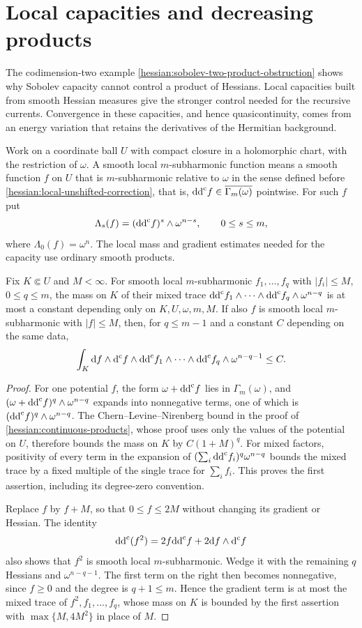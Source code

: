 \section{Local capacities and decreasing products}
\label{sec:hessian-smooth-capacity}

The codimension-two example
\cref{hessian:sobolev-two-product-obstruction} shows why Sobolev
capacity cannot control a product of Hessians. Local capacities built
from smooth Hessian measures give the stronger control needed for the
recursive currents. Convergence in these capacities, and hence
quasicontinuity, comes from an energy variation that retains the
derivatives of the Hermitian background.

Work on a coordinate ball $U$ with compact closure in a holomorphic
chart, with the restriction of $\omega$. A smooth local
$m$-subharmonic function means a smooth function $f$ on $U$ that is
$m$-subharmonic relative to $\omega$ in the sense defined before
\cref{hessian:local-unshifted-correction}, that is,
$\mathrm{dd}^{\mathrm{c}} f\in\overline{\Gamma_m(\omega)}$ pointwise. For such $f$ put
\[
 \Lambda_s(f)=(\mathrm{dd}^{\mathrm{c}} f)^s\wedge\omega^{n-s},\qquad0\leq s\leq m,
\]
where $\Lambda_0(f)=\omega^n$. The local mass and gradient estimates
needed for the capacity use ordinary smooth products.

\begin{lemma}\label{hessian:local-smooth-bounds}
Fix $K\Subset U$ and $M<\infty$. For smooth local $m$-subharmonic
$f_1,\ldots,f_q$ with $|f_i|\leq M$, $0\leq q\leq m$, the mass on $K$
of their mixed trace
$\mathrm{dd}^{\mathrm{c}} f_1\wedge\cdots\wedge\mathrm{dd}^{\mathrm{c}} f_q\wedge\omega^{n-q}$ is at most a
constant depending only on $K,U,\omega,m,M$. If also $f$ is smooth
local $m$-subharmonic with $|f|\leq M$, then, for $q\leq m-1$ and a
constant $C$ depending on the same data,
\[
 \int_K\mathrm df\wedge\mathrm d^{\mathrm c} f\wedge
       \mathrm{dd}^{\mathrm{c}} f_1\wedge\cdots\wedge\mathrm{dd}^{\mathrm{c}} f_q
                         \wedge\omega^{n-q-1}\leq C.
\]
\end{lemma}
\begin{proof}
For one potential $f$, the form $\omega+\mathrm{dd}^{\mathrm{c}} f$ lies in
$\Gamma_m(\omega)$, and $(\omega+\mathrm{dd}^{\mathrm{c}} f)^q\wedge\omega^{n-q}$ expands
into nonnegative terms, one of which is $(\mathrm{dd}^{\mathrm{c}} f)^q\wedge\omega^{n-q}$.
The Chern--Levine--Nirenberg bound in the proof of
\cref{hessian:continuous-products}, whose proof uses only the values of
the potential on $U$, therefore bounds the mass on $K$ by $C(1+M)^q$.
For mixed factors, positivity of every term in the expansion of
$(\sum_i\mathrm{dd}^{\mathrm{c}} f_i)^q\omega^{n-q}$ bounds the mixed trace by a fixed
multiple of the single trace for $\sum_i f_i$. This proves the first
assertion, including its degree-zero convention.

Replace $f$ by $f+M$, so that $0\leq f\leq2M$ without changing its
gradient or Hessian. The identity
\[
 \mathrm{dd}^{\mathrm{c}}(f^2)=2f\mathrm{dd}^{\mathrm{c}} f+2\mathrm df\wedge\mathrm d^{\mathrm c} f
\]
also shows that $f^2$ is smooth local $m$-subharmonic. Wedge it with
the remaining $q$ Hessians and $\omega^{n-q-1}$. The first term on
the right then becomes nonnegative, since $f\geq0$ and the degree is
$q+1\leq m$. Hence the gradient term is at most the mixed trace of
$f^2,f_1,\ldots,f_q$, whose mass on $K$ is bounded by the first
assertion with $\max\{M,4M^2\}$ in place of $M$.
\end{proof}

